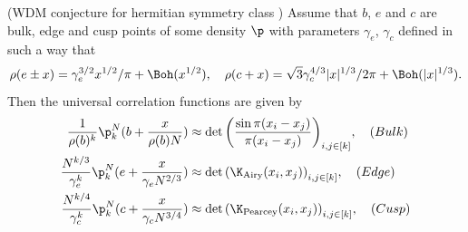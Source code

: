 \begin{conjecture}
	(WDM conjecture for hermitian symmetry class \cite{Schroder2019})
	Assume that $b$, $e$ and $c$ are bulk, edge and cusp points of some density $\p$ with parameters $\gamma_e$, $\gamma_c$ defined in such a way that
	\begin{equation}
		\rho(e \pm x) = \gamma_{e}^{3/2} x^{1/2} / \pi + \Boh(x^{1/2}), \quad  \rho(c + x) = \sqrt{3} \gamma_c^{4/3} |x|^{1/3}/2\pi + \Boh(|x|^{1/3}).
	\end{equation}
	Then the universal correlation functions are given by
	\begin{align}
		\frac{1}{\rho(b)^k} \p_k^{N}(b + \frac{x}{\rho(b) N }) & \approx \det{\left(\frac{\sin{\pi(x_i - x_j)}}{\pi(x_i - x_j)} \right)_{i,j \in [k]}}, \quad (Bulk) \\
		\frac{N^{k/3}}{\gamma_e^k} \p_k^{N}(e + \frac{x}{\gamma_e N^{2/3} }) & \approx \det{\left(\K_{\text{Airy}}(x_i, x_j) \right)_{i,j \in [k]}}, \quad (Edge) \\
		\frac{N^{k/4}}{\gamma_c^k} \p_k^{N}(c + \frac{x}{\gamma_c N^{3/4} }) & \approx \det{\left(\K_{\text{Pearcey}}(x_i, x_j) \right)_{i,j \in [k]}}, \quad (Cusp)
	\end{align}
\end{conjecture}

